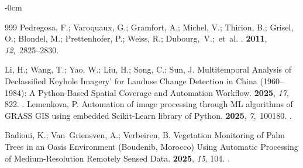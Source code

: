 \documentclass[jimaging,article,accept,pdftex,oneauthor]{Definitions/mdpi}
\begin{document}
\begin{adjustwidth}{-\extralength}{0cm}
\begin{thebibliography}{999}
Pedregosa, F.; Varoquaux, G.; Gramfort, A.; Michel, V.; Thirion, B.; Grisel,
  O.; Blondel, M.; Prettenhofer, P.; Weiss, R.; \mbox{Dubourg, V.;  et~al.}
.
 {\bf 2011}, {\em
  12},~2825--2830.

Li, H.; Wang, T.; Yao, W.; Liu, H.; Song, C.; Sun, J.
\newblock Multitemporal Analysis of Declassified Keyhole Imagery' for Landuse
  Change Detection in China (1960--1984): A Python-Based Spatial Coverage and
  Automation Workflow.
 {\bf 2025}, {\em 17}, {822}.
.
\newpage
{}
Lemenkova, P.
\newblock Automation of image processing through ML algorithms of GRASS GIS
  using embedded Scikit-Learn library of Python.
 {\bf 2025}, {\em 7},~100180.
.

Badioui, K.; Van~Griensven, A.; Verbeiren, B.
\newblock Vegetation Monitoring of Palm Trees in an Oasis Environment
  (Boudenib, Morocco) Using Automatic Processing of Medium-Resolution Remotely
  Sensed Data.
 {\bf 2025}, {\em 15}, 104.
.

\end{thebibliography}
\PublishersNote{}

\end{adjustwidth}
\end{document}
